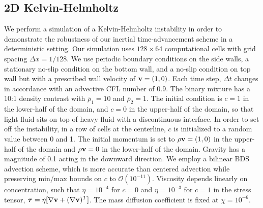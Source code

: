 \documentclass[final]{siamltex}
\def\vb {{\bf v}}
\def\taub   {\boldsymbol{\tau}}
\begin{document}
\subsection{2D Kelvin-Helmholtz}
We perform a simulation of a Kelvin-Helmholtz instability in order to demonstrate
the robustness of our inertial time-advancement scheme in a deterministic setting.
Our simulation uses $128\times 64$ computational cells with grid spacing
$\Delta x=1/128$.  We use periodic boundary conditions on the side walls, a 
stationary no-slip condition on the bottom wall, and a no-slip condition on top wall
but with a prescribed wall velocity of $\vb=(1,0)$.
Each time step, $\Delta t$ changes in accordance with an
advective CFL number of 0.9.  The binary mixture has a 10:1 density contrast with
$\bar\rho_1=10$ and $\bar\rho_2=1$.  The initial condition is $c=1$ in the lower-half
of the domain, and $c=0$ in the upper-half of the domain, so that light fluid
sits on top of heavy fluid with a discontinuous interface.
In order to set off the instability, 
in a row of cells at the centerline, $c$ is initialized to a random value between 0 and 1.
The initial momentum is set to $\rho\vb=(1,0)$ in the upper-half of
the domain and $\rho\vb=0$ in the lower-half of the domain.
Gravity has a magnitude of 0.1 acting in the downward direction.
We employ a bilinear BDS advection scheme, which is more accurate than centered
advection while preserving min/max bounds on $c$ to $\mathcal O(10^{-11})$.
Viscosity depends linearly on concentration, such that $\eta=10^{-4}$ for $c=0$ 
and $\eta=10^{-3}$ for $c=1$ in the stress tensor,
$\taub = \eta[\nabla\vb + (\nabla\vb)^T]$.
The mass diffusion coefficient is fixed at $\chi=10^{-6}$.
\end{document}
